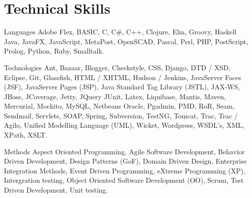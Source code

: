 \section*{Technical Skills}

	\begin{skillList}
		\item[Languages] Adobe Flex, BASIC, C, C\#, C++, Clojure, Elm, Groovy, Haskell
		Java, JavaFX, JavaScript, MetaPost, OpenSCAD, Pascal, Perl, PHP, PostScript, 
		Prolog, Python, Ruby, Smalltalk.\hfill\\
		
		\item[Technologies] Ant, Bazaar, Blogger, Checkstyle, CSS, Django, DTD / XSD, 
		Eclipse, Git, Glassfish, HTML / XHTML, Hudson / Jenkins, 
		JavaServer Faces (JSF), JavaServer Pages (JSP), 
		Java Standard Tag Library (JSTL), JAX-WS, JBoss, JCoverage, Jetty, JQuery
		JUnit, Latex, Liquibase, Mantis, Maven, Mercurial, Mockito, MySQL, Netbeans
		Oracle, Pgadmin, PMD, RoR, Seam, Sendmail, Servlets, SOAP, Spring, Subversion,
		TestNG, Tomcat, Trac, Trac / Agilo, Unified Modelling Language (UML),
		Wicket, Wordpress, WSDL's, XML, XPath, XSLT.\hfill\\
		
		\item[Methods] Aspect Oriented Programming, Agile Software Development,
		Behavior Driven Development, Design Patterns (GoF), Domain Driven Design, 
		Enterprise Integration Methods, Event Driven Programming, 
		eXtreme Programming (XP), Intergration testing, Object Oriented Software Development (OO), 
		Scrum, Test Driven Development, Unit testing.\hfill\\
		
	\end{skillList}
